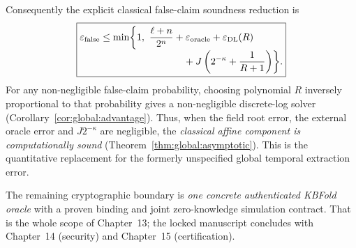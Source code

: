 Consequently the explicit classical
false-claim soundness reduction is
\[
 \boxed{
 \begin{aligned}
 \varepsilon_{\rm false}
 &\le\min\biggl\{1,\
 \frac{\ell+n}{2^n}
 +\varepsilon_{\rm oracle}
 +\varepsilon_{\rm DL}(R)\\[-1mm]
 &\hspace{30mm}
 +J\left(2^{-\kappa}+\frac1{R+1}\right)
 \biggr\}.
 \end{aligned}}
\]
For any non-negligible false-claim
probability, choosing polynomial
$R$ inversely proportional to that
probability gives a non-negligible
discrete-log solver
(Corollary~\ref{cor:global:advantage}).
Thus, when the field root error,
the external oracle error and
$J2^{-\kappa}$ are negligible,
the \emph{classical affine
component is computationally sound}
(Theorem~\ref{thm:global:asymptotic}).
This is the quantitative
replacement for the formerly
unspecified global temporal
extraction error.

The remaining cryptographic
boundary is \emph{one concrete
authenticated KBFold oracle}
with a proven binding and
joint zero-knowledge simulation
contract. That is the whole
scope of Chapter~13; the
locked manuscript concludes
with Chapter~14 (security)
and Chapter~15 (certification).
